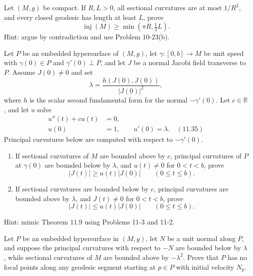 \begin{exercise}
\label{prob:injectivity-radius-comparison}

Let $(M,g)$ be compact.  If $R,L>0$, all sectional curvatures are at most
$1/R^2$, and every closed geodesic has length at least $L$, prove
\[
\operatorname{inj}(M)\geq\min(\pi R,\tfrac12L).
\]
Hint: argue by contradiction and use Problem 10-23(b).
\end{exercise}

\begin{exercise}
\label{prob:transverse-jacobi-comparison}

Let $P$ be an embedded hypersurface of $(M,g)$, let
$\gamma:[0,b]\to M$ be unit speed with $\gamma(0)\in P$ and
$\gamma'(0)\perp P$, and let $J$ be a normal Jacobi field transverse to $P$.
Assume $J(0)\ne0$ and set
\[
\lambda=\frac{h(J(0),J(0))}{|J(0)|^2},
\]
where $h$ is the scalar second fundamental form for the normal
$-\gamma'(0)$.  Let $c\in\mathbb R$, and let $u$ solve
\begin{align*}
u''(t)+cu(t)&=0,\\
u(0)&=1,\qquad u'(0)=\lambda. \quad (11.35)
\end{align*}
Principal curvatures below are computed with respect to $-\gamma'(0)$.
\begin{enumerate}
\item[(a)] If sectional curvatures of $M$ are bounded above by $c$, principal
curvatures of $P$ at $\gamma(0)$ are bounded below by $\lambda$, and
$u(t)\ne0$ for $0<t<b$, prove
\[
|J(t)|\geq u(t)|J(0)|\qquad(0\leq t\leq b).
\]
\item[(b)] If sectional curvatures are bounded below by $c$, principal
curvatures are bounded above by $\lambda$, and $J(t)\ne0$ for $0<t<b$,
prove
\[
|J(t)|\leq u(t)|J(0)|\qquad(0\leq t\leq b).
\]
\end{enumerate}
Hint: mimic Theorem 11.9 using Problems 11-3 and 11-2.
\end{exercise}

\begin{exercise}
\label{prob:focal-points-hypersurface}

Let $P$ be an embedded hypersurface in $(M,g)$, let $N$ be a unit normal along
$P$, and suppose the principal curvatures with respect to $-N$ are bounded
below by $\lambda$, while sectional curvatures of $M$ are bounded above by
$-\lambda^2$.  Prove that $P$ has no focal points along any geodesic segment
starting at $p\in P$ with initial velocity $N_p$.
\end{exercise}

